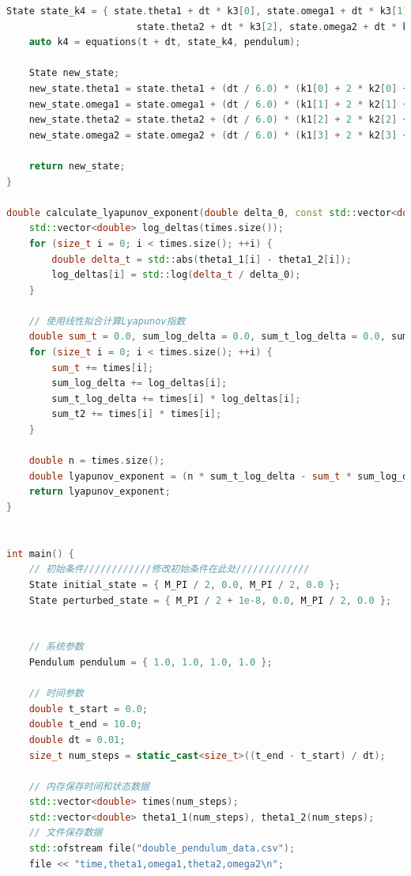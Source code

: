 \documentclass[12pt, a4paper, oneside]{article}
\begin{document}
\begin{lstlisting}[language = C++, name = double_pendulum_main.cpp]
    State state_k4 = { state.theta1 + dt * k3[0], state.omega1 + dt * k3[1],
                       state.theta2 + dt * k3[2], state.omega2 + dt * k3[3] };
    auto k4 = equations(t + dt, state_k4, pendulum);

    State new_state;
    new_state.theta1 = state.theta1 + (dt / 6.0) * (k1[0] + 2 * k2[0] + 2 * k3[0] + k4[0]);
    new_state.omega1 = state.omega1 + (dt / 6.0) * (k1[1] + 2 * k2[1] + 2 * k3[1] + k4[1]);
    new_state.theta2 = state.theta2 + (dt / 6.0) * (k1[2] + 2 * k2[2] + 2 * k3[2] + k4[2]);
    new_state.omega2 = state.omega2 + (dt / 6.0) * (k1[3] + 2 * k2[3] + 2 * k3[3] + k4[3]);

    return new_state;
}

double calculate_lyapunov_exponent(double delta_0, const std::vector<double>& times, const std::vector<double>& theta1_1, const std::vector<double>& theta1_2) {
    std::vector<double> log_deltas(times.size());
    for (size_t i = 0; i < times.size(); ++i) {
        double delta_t = std::abs(theta1_1[i] - theta1_2[i]);
        log_deltas[i] = std::log(delta_t / delta_0);
    }

    // 使用线性拟合计算Lyapunov指数
    double sum_t = 0.0, sum_log_delta = 0.0, sum_t_log_delta = 0.0, sum_t2 = 0.0;
    for (size_t i = 0; i < times.size(); ++i) {
        sum_t += times[i];
        sum_log_delta += log_deltas[i];
        sum_t_log_delta += times[i] * log_deltas[i];
        sum_t2 += times[i] * times[i];
    }

    double n = times.size();
    double lyapunov_exponent = (n * sum_t_log_delta - sum_t * sum_log_delta) / (n * sum_t2 - sum_t * sum_t);
    return lyapunov_exponent;
}


int main() {
    // 初始条件////////////修改初始条件在此处/////////////
    State initial_state = { M_PI / 2, 0.0, M_PI / 2, 0.0 };
    State perturbed_state = { M_PI / 2 + 1e-8, 0.0, M_PI / 2, 0.0 };


    // 系统参数
    Pendulum pendulum = { 1.0, 1.0, 1.0, 1.0 };

    // 时间参数
    double t_start = 0.0;
    double t_end = 10.0;
    double dt = 0.01;
    size_t num_steps = static_cast<size_t>((t_end - t_start) / dt);

    // 内存保存时间和状态数据
    std::vector<double> times(num_steps);
    std::vector<double> theta1_1(num_steps), theta1_2(num_steps);
    // 文件保存数据
    std::ofstream file("double_pendulum_data.csv");
    file << "time,theta1,omega1,theta2,omega2\n";


\end{lstlisting}
\end{document}
